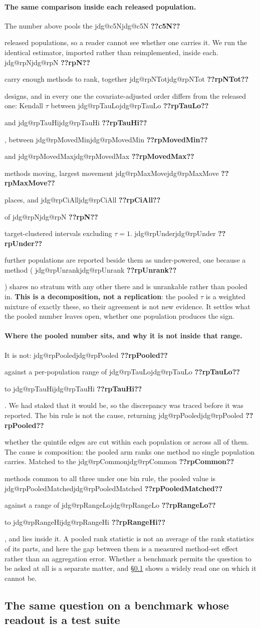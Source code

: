 \documentclass[11pt]{article}
\makeatletter
\newcommand{\jdg}[1]{%
  \ifcsname jdg@#1\endcsname\csname jdg@#1\endcsname
  \else\textbf{??#1??}\PackageError{rna}{undefined measured quantity #1}{}\fi}
\makeatother
\begin{document}
\paragraph{The same comparison inside each released population.} The number above pools the
\jdg{c5N} released populations, so a reader cannot see whether one carries it. We run the identical
estimator, imported rather than reimplemented, inside each. \jdg{rpN} carry enough methods to rank,
together \jdg{rpNTot} designs, and in every one the covariate-adjusted order differs from the
released one: Kendall $\tau$ between \jdg{rpTauLo} and \jdg{rpTauHi}, between \jdg{rpMovedMin} and
\jdg{rpMovedMax} methods moving, largest movement \jdg{rpMaxMove} places, and \jdg{rpCiAll} of
\jdg{rpN} target-clustered intervals excluding $\tau=1$. \jdg{rpUnder} further populations are
reported beside them as under-powered, one because a method (\jdg{rpUnrank}) shares no stratum with
any other there and is unrankable rather than pooled in. \textbf{This is a decomposition, not a
replication}: the pooled $\tau$ is a weighted mixture of exactly these, so their agreement is not
new evidence. It settles what the pooled number leaves open, whether one population produces the
sign.

\paragraph{Where the pooled number sits, and why it is not inside that range.} It is not:
\jdg{rpPooled} against a per-population range of \jdg{rpTauLo} to \jdg{rpTauHi}. We had staked that
it would be, so the discrepancy was traced before it was reported. The bin rule is not the cause,
returning \jdg{rpPooled} whether the quintile edges are cut within each population or across all of
them. The cause is composition: the pooled arm ranks one method no single population carries.
Matched to the \jdg{rpCommon} methods common to all three under one bin rule, the pooled value is
\jdg{rpPooledMatched} against a range of \jdg{rpRangeLo} to \jdg{rpRangeHi}, and lies inside it. A
pooled rank statistic is not an average of the rank statistics of its parts, and here the gap
between them is a measured method-set effect rather than an aggregation error. Whether a
benchmark permits the question to be asked at all is a separate matter, and \S\ref{sec:swebench}
shows a widely read one on which it cannot be.

\subsection{The same question on a benchmark whose readout is a test suite}
\label{sec:swebench}
\end{document}
